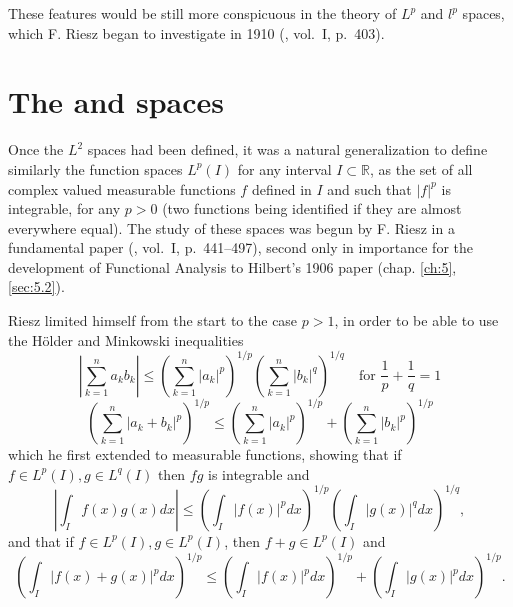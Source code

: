 \documentclass[12pt,a4paper,leqno,twoside]{extbook}
\newcommand{\R}{\mathbb{R}}
\begin{document}
These features would be still more conspicuous in the theory of \(L^p\) and \(l^p\) spaces, which F. Riesz began to investigate in 1910 (\cite{183}, vol.~I, p.~403).

\section{The  and  spaces}
\label{sec:6.2}

Once the \(L^2\) spaces had been defined, it was a natural generalization to define similarly the function spaces \(L^p(I)\) for any interval \(I \subset \R\), as the set of all complex valued measurable functions \(f\) defined in \(I\) and such that \(|f|^p\) is integrable, for any \(p > 0\) (two functions being identified if they are almost everywhere equal). The study of these spaces was begun by F. Riesz in a fundamental paper (\cite{183}, vol.~I, p.~441--497), second only in importance for the development of Functional Analysis to Hilbert's 1906 paper (chap. \ref{ch:5}, \ref{sec:5.2}).

Riesz limited himself from the start to the case \(p > 1\), in order to be able to use the Hölder and Minkowski inequalities
\begin{equation}
    \label{eq:6.4}
    \left| \sum_{k=1}^n a_k b_k \right| \leq \left( \sum_{k=1}^n |a_k|^p \right)^{1 / p} \left( \sum_{k=1}^n |b_k|^q \right)^{1 / q} \quad \text{for } \frac{1}{p} + \frac{1}{q} = 1
\end{equation}
\begin{equation}
    \label{eq:6.5}
    \left( \sum_{k=1}^n |a_k + b_k|^p \right)^{1 / p} \leq \left( \sum_{k=1}^n |a_k|^p \right)^{1 / p} + \left( \sum_{k=1}^n |b_k|^p \right)^{1 / p}
\end{equation}
which he first extended to measurable functions, showing that if \(f \in L^p(I), g \in L^q(I)\) then \(fg\) is integrable and
\begin{equation}
    \label{eq:6.6}
    \left| \int_I f(x)g(x)dx \right| \leq \left( \int_I |f(x)|^p dx \right)^{1 / p} \left( \int_I |g(x)|^q dx \right)^{1 / q},
\end{equation}
and that if \(f \in L^p(I), g \in L^p(I)\), then \(f + g \in L^p(I)\) and
\begin{equation}
    \label{eq:6.7}
    \left( \int_I |f(x) + g(x)|^p dx \right)^{1 / p} \leq \left( \int_I |f(x)|^p dx \right)^{1 / p} + \left( \int_I |g(x)|^p dx \right)^{1 / p}.
\end{equation}
\end{document}
